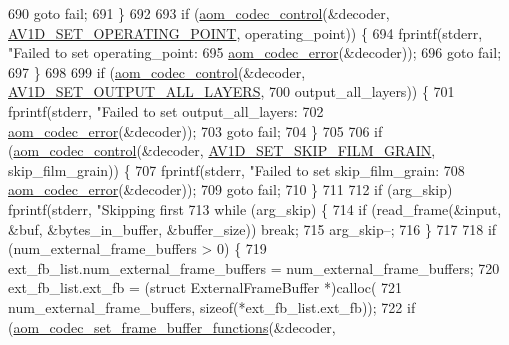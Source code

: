 \begin{DoxyCodeInclude}
{{{{{{{{{{{{{{{{{{{{{{{{{{{{{{{{{{690     \textcolor{keywordflow}{goto} fail;
691   \}
692 
693   \textcolor{keywordflow}{if} (\hyperlink{group__codec_ga6da974f4eeaba1fa74106b28d0fe6ac5}{aom\_codec\_control}(&decoder, \hyperlink{group__aom__decoder_gga3865fd4b3192489baa9a5c3632ebe97baa8b955fc5a2f6e33c6dad858d7c15f67}{AV1D\_SET\_OPERATING\_POINT}, 
      operating\_point)) \{
694     fprintf(stderr, \textcolor{stringliteral}{"Failed to set operating\_point: %
695             \hyperlink{group__codec_ga50949c0854605c722832bbfb0803f5f4}{aom\_codec\_error}(&decoder));
696     \textcolor{keywordflow}{goto} fail;
697   \}
698 
699   \textcolor{keywordflow}{if} (\hyperlink{group__codec_ga6da974f4eeaba1fa74106b28d0fe6ac5}{aom\_codec\_control}(&decoder, \hyperlink{group__aom__decoder_gga3865fd4b3192489baa9a5c3632ebe97ba8d51f96b8877b665225f5cfaa73ded8e}{AV1D\_SET\_OUTPUT\_ALL\_LAYERS},
700                         output\_all\_layers)) \{
701     fprintf(stderr, \textcolor{stringliteral}{"Failed to set output\_all\_layers: %
702             \hyperlink{group__codec_ga50949c0854605c722832bbfb0803f5f4}{aom\_codec\_error}(&decoder));
703     \textcolor{keywordflow}{goto} fail;
704   \}
705 
706   \textcolor{keywordflow}{if} (\hyperlink{group__codec_ga6da974f4eeaba1fa74106b28d0fe6ac5}{aom\_codec\_control}(&decoder, \hyperlink{group__aom__decoder_gga3865fd4b3192489baa9a5c3632ebe97ba17fa09c9ce1ae4a68eae21efd219418b}{AV1D\_SET\_SKIP\_FILM\_GRAIN}, 
      skip\_film\_grain)) \{
707     fprintf(stderr, \textcolor{stringliteral}{"Failed to set skip\_film\_grain: %
708             \hyperlink{group__codec_ga50949c0854605c722832bbfb0803f5f4}{aom\_codec\_error}(&decoder));
709     \textcolor{keywordflow}{goto} fail;
710   \}
711 
712   \textcolor{keywordflow}{if} (arg\_skip) fprintf(stderr, \textcolor{stringliteral}{"Skipping first %
713   \textcolor{keywordflow}{while} (arg\_skip) \{
714     \textcolor{keywordflow}{if} (read\_frame(&input, &buf, &bytes\_in\_buffer, &buffer\_size)) \textcolor{keywordflow}{break};
715     arg\_skip--;
716   \}
717 
718   \textcolor{keywordflow}{if} (num\_external\_frame\_buffers > 0) \{
719     ext\_fb\_list.num\_external\_frame\_buffers = num\_external\_frame\_buffers;
720     ext\_fb\_list.ext\_fb = (\textcolor{keyword}{struct }ExternalFrameBuffer *)calloc(
721         num\_external\_frame\_buffers, \textcolor{keyword}{sizeof}(*ext\_fb\_list.ext\_fb));
722     \textcolor{keywordflow}{if} (\hyperlink{group__cap__external__frame__buffer_ga1818a812e4d1e70eeafbe5b0ee538d6e}{aom\_codec\_set\_frame\_buffer\_functions}(&decoder, 
}}}}}}}}}}}}}}}}}}}}}}}}}}}}}}}}}}}}}}
\end{DoxyCodeInclude}
